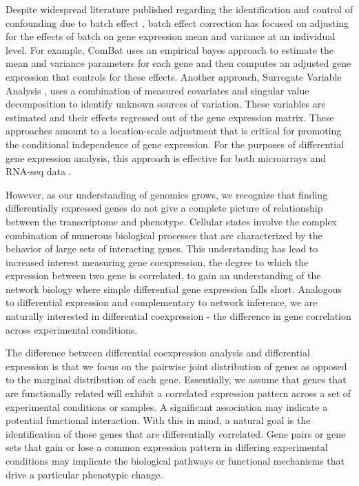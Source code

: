 Despite widespread literature published regarding the identification
and control of confounding due to batch effect \cite{chen2011removing,benito2004adjustment,leek2007capturing,johnson2007adjusting,nygaard2016methods},
batch effect correction has focused on adjusting for the effects of
batch on gene expression mean and variance at an individual level.
For example, ComBat \cite{johnson2007adjusting} uses an empirical
bayes approach to estimate the mean and variance parameters for each
gene and then computes an adjusted gene expression that controls for
these effects. Another approach, Surrogate Variable Analysis \cite{leek2007capturing},
uses a combination of measured covariates and singular value decomposition
to identify unknown sources of variation. These variables are estimated
and their effects regressed out of the gene expression matrix. These
approaches amount to a location-scale adjustment that is critical
for promoting the conditional independence of gene expression. For
the purposes of differential gene expression analysis, this approach
is effective for both microarrays and RNA-seq data \cite{conesa2016survey}.

However, as our understanding of genomics grows, we recognize that
finding differentially expressed genes do not give a complete picture
of relationship between the transcriptome and phenotype. Cellular
states involve the complex combination of numerous biological processes
that are characterized by the behavior of large sets of interacting
genes. This understanding has lead to increased interest measuring
gene coexpression, the degree to which the expression between two
gene is correlated, to gain an understanding of the network biology
where simple differential gene expression falls short. Analogous to
differential expression and complementary to network inference, we
are naturally interested in differential coexpression - the difference
in gene correlation across experimental conditions.

The difference between differential coexpression analysis and differential
expression is that we focus on the pairwise joint distribution of
genes as opposed to the marginal distribution of each gene. Essentially,
we assume that genes that are functionally related will exhibit a
correlated expression pattern across a set of experimental conditions
or samples. A significant association may indicate a potential functional
interaction. With this in mind, a natural goal is the identification
of those genes that are differentially correlated. Gene pairs or gene
sets that gain or lose a common expression pattern in differing experimental
conditions may implicate the biological pathways or functional mechanisms
that drive a particular phenotypic change.

